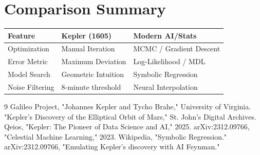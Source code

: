 \documentclass[11pt]{article}
\begin{document}
\section{Comparison Summary}
\begin{center}
\begin{tabular}{lll}
\toprule
\textbf{Feature} & \textbf{Kepler (1605)} & \textbf{Modern AI/Stats} \\ \midrule
Optimization & Manual Iteration & MCMC / Gradient Descent \\
Error Metric & Maximum Deviation & Log-Likelihood / MDL \cite{1.3.5} \\
Model Search & Geometric Intuition & Symbolic Regression \cite{1.5.8} \\
Noise Filtering & 8-minute threshold & Neural Interpolation \cite{1.3.5} \\ \bottomrule
\end{tabular}
\end{center}

\begin{thebibliography}{9}
 Galileo Project, "Johannes Kepler and Tycho Brahe," University of Virginia.
 "Kepler's Discovery of the Elliptical Orbit of Mars," St. John's Digital Archives.
 Qeios, "Kepler: The Pioneer of Data Science and AI," 2025.
 arXiv:2312.09766, "Celestial Machine Learning," 2023.
 Wikipedia, "Symbolic Regression."
 arXiv:2312.09766, "Emulating Kepler's discovery with AI Feynman."
\end{thebibliography}
\end{document}
